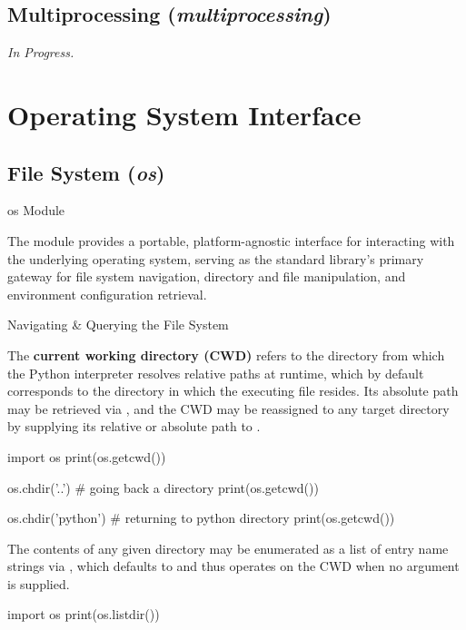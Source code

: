 \documentclass[10pt]{article}
\begin{document}
  \subsection{Multiprocessing (\textit{multiprocessing})}

    \textit{In Progress.}

\section{Operating System Interface}

  \subsection{File System (\textit{os})}

    \begin{core}{os Module}

      The \href{https://docs.python.org/3/library/os.html#module-os}{} module provides a portable, platform-agnostic interface for interacting with the underlying operating system, serving as the standard library's primary gateway for file system navigation, directory and file manipulation, and environment configuration retrieval.

    \end{core}

    \begin{core}{Navigating \& Querying the File System}

      The \textbf{current working directory (CWD)} refers to the directory from which the Python interpreter resolves relative paths at runtime, which by default corresponds to the directory in which the executing  file resides. Its absolute path may be retrieved via , and the CWD may be reassigned to any target directory by supplying its relative or absolute path to .

      \begin{pyconsole}

        import os
        print(os.getcwd())

        os.chdir('..') # going back a directory
        print(os.getcwd())

        os.chdir('python') # returning to python directory
        print(os.getcwd())

      \end{pyconsole}

      The contents of any given directory may be enumerated as a list of entry name strings via , which defaults to  and thus operates on the CWD when no argument is supplied.

      \begin{pyconsole}

        import os
        print(os.listdir())

      \end{pyconsole}

    \end{core}
\end{document}
